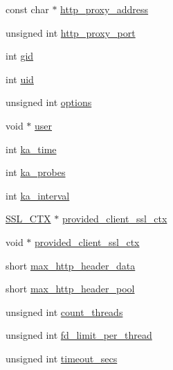 \begin{DoxyCompactItemize}
\item 
const char $\ast$ \hyperlink{structlws__context__creation__info_aef917c0b23976a264d2474901b4f5aa3}{http\+\_\+proxy\+\_\+address}
\item 
unsigned int \hyperlink{structlws__context__creation__info_a7b59f2bdc869871e7bde232db94f5ca6}{http\+\_\+proxy\+\_\+port}
\item 
int \hyperlink{structlws__context__creation__info_a9c9d22437de92c197f3cee52912b2c03}{gid}
\item 
int \hyperlink{structlws__context__creation__info_ac105b4180008cb3e672d57beead8382e}{uid}
\item 
unsigned int \hyperlink{structlws__context__creation__info_a9d3b17a25e1fbc772f21eb4959a82724}{options}
\item 
void $\ast$ \hyperlink{structlws__context__creation__info_a0e9d94cdfb893d777b4a4db81e7b5ac0}{user}
\item 
int \hyperlink{structlws__context__creation__info_ac583ce92b8e1c949cb6fef6bfe713d56}{ka\+\_\+time}
\item 
int \hyperlink{structlws__context__creation__info_a3baab4285c679fbe027c2504621d7410}{ka\+\_\+probes}
\item 
int \hyperlink{structlws__context__creation__info_a381342a398883d6204955ff3c1849ddd}{ka\+\_\+interval}
\item 
\hyperlink{structlws__polarssl__context}{S\+S\+L\+\_\+\+C\+TX} $\ast$ \hyperlink{structlws__context__creation__info_a1654d41bea6fb2f619b57e6a264b26a4}{provided\+\_\+client\+\_\+ssl\+\_\+ctx}
\item 
void $\ast$ \hyperlink{structlws__context__creation__info_a0e790dda6202604f73a03b6149bc12bb}{provided\+\_\+client\+\_\+ssl\+\_\+ctx}
\item 
short \hyperlink{structlws__context__creation__info_a0cdfd3c484689ba6f0f2cc91b38ce948}{max\+\_\+http\+\_\+header\+\_\+data}
\item 
short \hyperlink{structlws__context__creation__info_a0b154e79abc1167ba4ac3539f4af6720}{max\+\_\+http\+\_\+header\+\_\+pool}
\item 
unsigned int \hyperlink{structlws__context__creation__info_ae52f3237e144e9ddcab5e2cf91d1e419}{count\+\_\+threads}
\item 
unsigned int \hyperlink{structlws__context__creation__info_a45e63e24c88289e0c8352377ef4d3646}{fd\+\_\+limit\+\_\+per\+\_\+thread}
\item 
unsigned int \hyperlink{structlws__context__creation__info_a6cfa3d51df2def3349a5cbf0d712822d}{timeout\+\_\+secs}

\end{DoxyCompactItemize}
